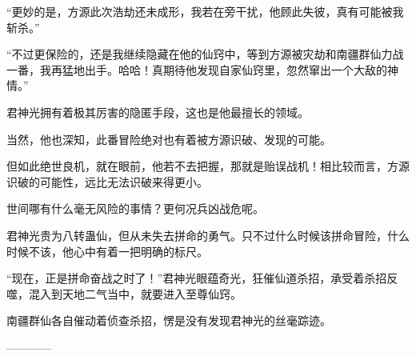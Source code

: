 \begin{this_body}
“更妙的是，方源此次浩劫还未成形，我若在旁干扰，他顾此失彼，真有可能被我斩杀。”

“不过更保险的，还是我继续隐藏在他的仙窍中，等到方源被灾劫和南疆群仙力战一番，我再猛地出手。哈哈！真期待他发现自家仙窍里，忽然窜出一个大敌的神情。”

君神光拥有着极其厉害的隐匿手段，这也是他最擅长的领域。

当然，他也深知，此番冒险绝对也有着被方源识破、发现的可能。

但如此绝世良机，就在眼前，他若不去把握，那就是贻误战机！相比较而言，方源识破的可能性，远比无法识破来得更小。

世间哪有什么毫无风险的事情？更何况兵凶战危呢。

君神光贵为八转蛊仙，但从未失去拼命的勇气。只不过什么时候该拼命冒险，什么时候不该，他心中有着一把明确的标尺。

“现在，正是拼命奋战之时了！”君神光眼蕴奇光，狂催仙道杀招，承受着杀招反噬，混入到天地二气当中，就要进入至尊仙窍。

南疆群仙各自催动着侦查杀招，愣是没有发现君神光的丝毫踪迹。

------------

\end{this_body}


